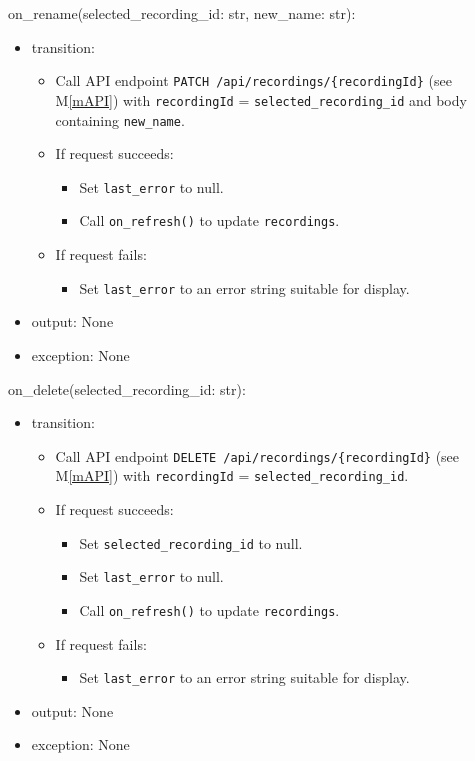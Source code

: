 \documentclass[12pt, titlepage]{article}
\newcommand{\mref}[1]{M\ref{#1}}
\begin{document}
\noindent on\_rename(selected\_recording\_id: str, new\_name: str):
\begin{itemize}
  \item transition:
        \begin{itemize}
          \item Call API endpoint \texttt{PATCH /api/recordings/\{recordingId\}} (see
                \mref{mAPI}) with \texttt{recordingId} = \texttt{selected\_recording\_id} and
                body containing \texttt{new\_name}.
          \item If request succeeds:
                \begin{itemize}
                  \item Set \texttt{last\_error} to null.
                  \item Call \texttt{on\_refresh()} to update \texttt{recordings}.
                \end{itemize}
          \item If request fails:
                \begin{itemize}
                  \item Set \texttt{last\_error} to an error string suitable for display.
                \end{itemize}
        \end{itemize}
  \item output: None
  \item exception: None
\end{itemize}

\noindent on\_delete(selected\_recording\_id: str):
\begin{itemize}
  \item transition:
        \begin{itemize}
          \item Call API endpoint \texttt{DELETE /api/recordings/\{recordingId\}} (see
                \mref{mAPI}) with \texttt{recordingId} = \texttt{selected\_recording\_id}.
          \item If request succeeds:
                \begin{itemize}
                  \item Set \texttt{selected\_recording\_id} to null.
                  \item Set \texttt{last\_error} to null.
                  \item Call \texttt{on\_refresh()} to update \texttt{recordings}.
                \end{itemize}
          \item If request fails:
                \begin{itemize}
                  \item Set \texttt{last\_error} to an error string suitable for display.
                \end{itemize}
        \end{itemize}
  \item output: None
  \item exception: None
\end{itemize}
\end{document}
